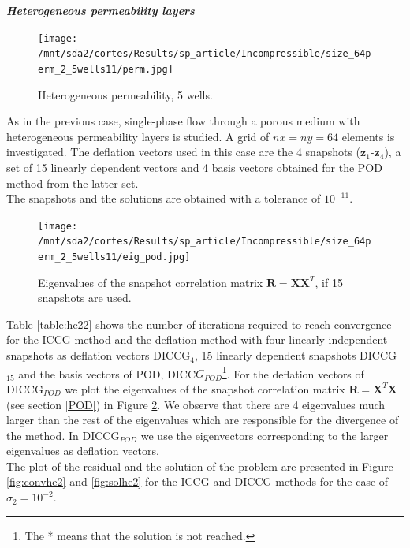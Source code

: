 \documentclass[12pt]{article}
\begin{document}
\normalsize

\emph{\textbf{Heterogeneous permeability layers}}\\

\begin{figure}
\centering 
\vspace{-10pt}
\texttt{[image: /mnt/sda2/cortes/Results/sp\_article/Incompressible/size\_64perm\_2\_5wells11/perm.jpg]}
 \vspace{-25pt}
\caption{ Heterogeneous permeability, 5 wells.}\label{fig:hep_2}
\vspace{-15pt}
\end{figure} 
As in the previous case, single-phase flow through a porous medium with heterogeneous permeability layers is studied.
A grid of $nx = ny = 64$ elements is investigated. The deflation vectors used in this case are the 4 snapshots ($\mathbf{z}_1$-$\mathbf{z}_4$), a set of 15 linearly dependent vectors and 4 basis vectors obtained for the POD method from the latter set.\\
The snapshots and the solutions are obtained with a tolerance of $10^{-11}$. \\

\begin{figure}[H]
 \centering
\texttt{[image: /mnt/sda2/cortes/Results/sp\_article/Incompressible/size\_64perm\_2\_5wells11/eig\_pod.jpg]}
\caption{Eigenvalues of the snapshot correlation matrix $\mathbf{R}=\mathbf{X}\mathbf{X}^T$, if 15 snapshots are used.}
\label{fig:eig}
\end{figure} 
Table \ref{table:he22} shows the number of iterations required to reach convergence for the ICCG method and the deflation method with four linearly independent snapshots as deflation vectors DICCG$_{4}$, 15 linearly dependent snapshots DICCG$_{15}$ and the basis vectors of POD, DICC$G_{POD}$\footnote{The * means that the solution is not reached.}. 
For the deflation vectors of DICCG$_{POD}$ we plot the eigenvalues of the snapshot correlation matrix $\mathbf{R}=\mathbf{X}^T \mathbf{X}$ (see section \ref{POD}) in Figure \ref{fig:eig}. We observe that there are 4 eigenvalues much larger than the rest of the eigenvalues which are responsible for the divergence of the method. In DICCG$_{POD}$ we use the eigenvectors corresponding to the larger eigenvalues as deflation vectors.\\
The plot of the residual and the solution of the problem are presented in
Figure \ref{fig:convhe2} and \ref{fig:solhe2} for the ICCG and DICCG methods for the case of $\sigma_2=10^{-2}$.\\
\end{document}
